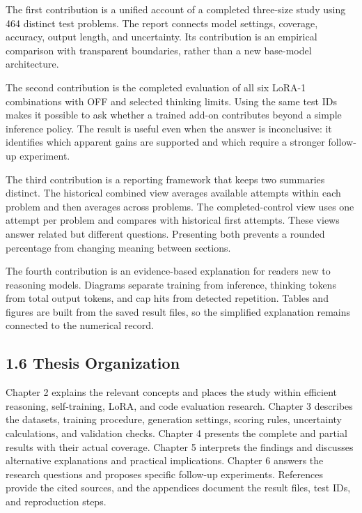 \documentclass[11pt,letterpaper]{article}
\begin{document}
The first contribution is a unified account of a completed three-size study using 464 distinct test problems. The report connects model settings, coverage, accuracy, output length, and uncertainty. Its contribution is an empirical comparison with transparent boundaries, rather than a new base-model architecture.\par

The second contribution is the completed evaluation of all six LoRA-1 combinations with OFF and selected thinking limits. Using the same test IDs makes it possible to ask whether a trained add-on contributes beyond a simple inference policy. The result is useful even when the answer is inconclusive: it identifies which apparent gains are supported and which require a stronger follow-up experiment.\par

The third contribution is a reporting framework that keeps two summaries distinct. The historical combined view averages available attempts within each problem and then averages across problems. The completed-control view uses one attempt per problem and compares with historical first attempts. These views answer related but different questions. Presenting both prevents a rounded percentage from changing meaning between sections.\par

The fourth contribution is an evidence-based explanation for readers new to reasoning models. Diagrams separate training from inference, thinking tokens from total output tokens, and cap hits from detected repetition. Tables and figures are built from the saved result files, so the simplified explanation remains connected to the numerical record.\par

\subsection*{1.6 Thesis Organization}

Chapter 2 explains the relevant concepts and places the study within efficient reasoning, self-training, LoRA, and code evaluation research. Chapter 3 describes the datasets, training procedure, generation settings, scoring rules, uncertainty calculations, and validation checks. Chapter 4 presents the complete and partial results with their actual coverage. Chapter 5 interprets the findings and discusses alternative explanations and practical implications. Chapter 6 answers the research questions and proposes specific follow-up experiments. References provide the cited sources, and the appendices document the result files, test IDs, and reproduction steps.\par
\end{document}

